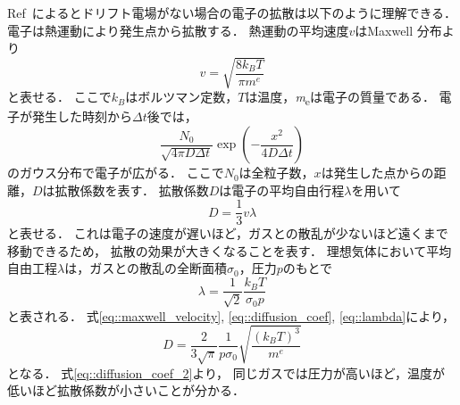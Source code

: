 \documentclass[../master]{subfiles}
\begin{document}
Ref~\cite{leo}によるとドリフト電場がない場合の電子の拡散は以下のように理解できる．
電子は熱運動により発生点から拡散する．
熱運動の平均速度$v$はMaxwell 分布より
\begin{equation}
  v = \sqrt{\frac{8k_{B}T}{\pi \si{\electronmass}}}
  \label{eq::maxwell_velocity}
\end{equation}
と表せる．
ここで$k_{B}$はボルツマン定数，$T$は温度，\si{\electronmass}は電子の質量である．
電子が発生した時刻から$\Delta t$後では，
\begin{equation}
  \frac{N_0}{\sqrt{4\pi D \Delta t}}\exp\left(-\frac{x^{2}}{4 D \Delta t}\right)
  \label{eq::gaus_dist}
\end{equation}
のガウス分布で電子が広がる．
ここで$N_{0}$は全粒子数，$x$は発生した点からの距離，$D$は拡散係数を表す．
拡散係数$D$は電子の平均自由行程$\lambda$を用いて
\begin{equation}
  D = \frac{1}{3}v\lambda
  \label{eq::diffusion_coef}
\end{equation}
と表せる．
これは電子の速度が遅いほど，ガスとの散乱が少ないほど遠くまで移動できるため，
拡散の効果が大きくなることを表す．
理想気体において平均自由工程$\lambda$は，ガスとの散乱の全断面積$\sigma_{0}$，圧力$p$のもとで
\begin{equation}
  \lambda = \frac{1}{\sqrt{2}}\frac{k_{B}T}{\sigma_{0}p}
  \label{eq::lambda}
\end{equation}
と表される．
式\ref{eq::maxwell_velocity}, \ref{eq::diffusion_coef}, \ref{eq::lambda}により，
\begin{equation}
  D = \frac{2}{3\sqrt{\pi}}\frac{1}{p\sigma_{0}}\sqrt{\frac{\left(k_{B}T\right)^{3}}{\si{\electronmass}}}
  \label{eq::diffusion_coef_2}
\end{equation}
となる．
式\ref{eq::diffusion_coef_2}より，
同じガスでは圧力が高いほど，温度が低いほど拡散係数が小さいことが分かる．
\end{document}
